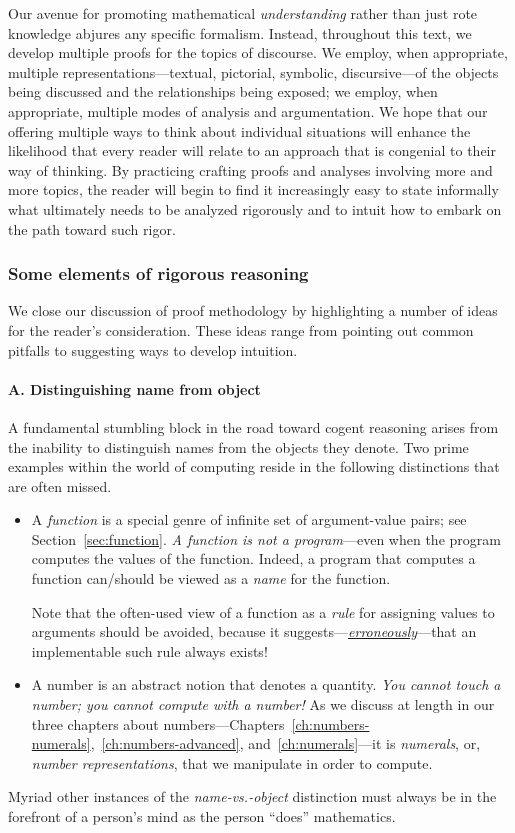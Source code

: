 Our avenue for promoting mathematical {\em understanding} rather than just rote knowledge abjures any specific formalism.  Instead, throughout this text, we develop multiple proofs for the topics of discourse.  We employ, when appropriate, multiple representations---textual, pictorial, symbolic, discursive---of the objects being discussed and the relationships being exposed; we employ, when appropriate, multiple modes of analysis and argumentation.  We hope that our offering multiple ways to think about individual situations will enhance the likelihood that every reader will relate to an approach that is congenial to their way of thinking.  By practicing crafting 
proofs and analyses involving more and more topics, the reader will begin to find it increasingly easy to state informally what ultimately needs to be analyzed rigorously and to intuit how to embark on the path toward such rigor.

\subsubsection{Some elements of rigorous reasoning}
\label{sec:elements-of-reasoning}

We close our discussion of proof methodology by highlighting a number of ideas for the reader's consideration.  These ideas range from pointing out common pitfalls to suggesting ways to develop intuition.

\paragraph{A. Distinguishing name from object}

A fundamental stumbling block in the road toward cogent reasoning arises from the inability to distinguish names from the objects they denote.  Two prime examples within the world of computing reside in the following distinctions that are often missed.
\begin{itemize}
\item
A {\it function} is a special genre of infinite set of argument-value pairs; see Section~\ref{sec:function}.  {\em A function is not a program}---even when the program computes the values of the function.  Indeed, a program that computes a function can/should be
viewed as a {\it name} for the function.

\smallskip

Note that the often-used view of a function as a {\em rule} for assigning values to arguments should be avoided, because it suggests---\underline{\em erroneously}---that an implementable such rule always exists!

\medskip\item
A number is an abstract notion that denotes a quantity.  {\em You cannot touch a number; you cannot compute with a number!}  As we discuss at length in our three chapters about numbers---Chapters~\ref{ch:numbers-numerals},~\ref{ch:numbers-advanced}, and~\ref{ch:numerals}---it is {\em numerals}, or, {\em number representations}, that we manipulate in order to compute.
\end{itemize}
Myriad other instances of the {\em name-vs.-object} distinction must always be in the forefront of a person's mind as the person ``does'' mathematics.

